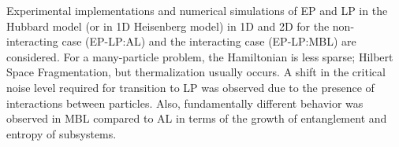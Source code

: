 Experimental implementations and numerical simulations of EP and LP in the Hubbard model (or in 1D Heisenberg model) in 1D and 2D for the non-interacting case (EP-LP:AL) and the interacting case (EP-LP:MBL) are considered.
For a many-particle problem, the Hamiltonian is less sparse;
Hilbert Space Fragmentation, but thermalization usually occurs. A shift in the critical noise level required for transition to LP was observed due to the presence of interactions between particles. Also, fundamentally different behavior was observed in MBL compared to AL in terms of the growth of entanglement and entropy of subsystems.